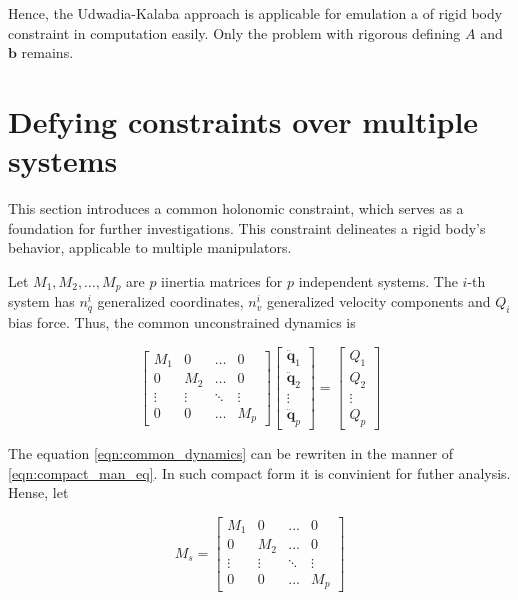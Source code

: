 Hence, the Udwadia-Kalaba approach is applicable for emulation a of 
rigid body constraint in computation easily. Only the problem with rigorous 
defining $A$ and $\mathbf{b}$ remains.

\section{Defying constraints over multiple systems}

This section introduces a common holonomic constraint, which serves as a foundation 
for further investigations. This constraint delineates a rigid body's behavior, 
applicable to multiple manipulators.

Let $M_1, M_2, \dots, M_p$ are $p$ iinertia matrices for $p$ independent systems. 
The $i$-th system has $n_q^i$ generalized coordinates, $n_v^i$ generalized velocity 
components and $Q_i$ bias force. Thus, the common unconstrained dynamics is

\begin{equation}
    \label{eqn:common_dynamics}
    \begin{bmatrix}
        M_1 & 0   & \dots & 0 \\
        0   & M_2 & \dots & 0 \\
        \vdots & \vdots & \ddots & \vdots \\
        0   & 0   & \dots & M_p
    \end{bmatrix}
    \begin{bmatrix}
        \ddot{\mathbf{q}}_1 \\ \ddot{\mathbf{q}}_2 \\ \vdots \\ \ddot{\mathbf{q}}_p
    \end{bmatrix}
    = 
    \begin{bmatrix}
        Q_1 \\ Q_2 \\ \vdots \\ Q_p
    \end{bmatrix}
\end{equation}

The equation \ref{eqn:common_dynamics} can be rewriten in the manner of
\ref{eqn:compact_man_eq}. In such compact form it is convinient for futher analysis. 
Hense, let

\begin{equation}
    \label{eqn:common_mass}
    M_s = 
    \begin{bmatrix}
        M_1 & 0   & \dots & 0 \\
        0   & M_2 & \dots & 0 \\
        \vdots & \vdots & \ddots & \vdots \\
        0   & 0   & \dots & M_p
    \end{bmatrix}
\end{equation}

